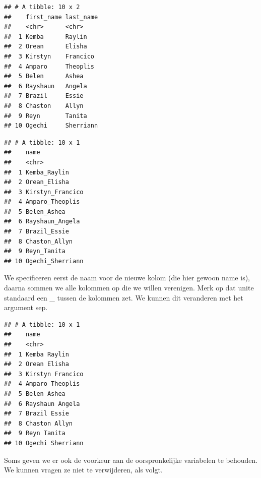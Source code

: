 \documentclass[]{tufte-book}
\newenvironment{Shaded}{}{}
\newcommand{\DataTypeTok}[1]{\textcolor[rgb]{0.56,0.13,0.00}{#1}}
\newcommand{\KeywordTok}[1]{\textcolor[rgb]{0.00,0.44,0.13}{\textbf{#1}}}
\newcommand{\NormalTok}[1]{#1}
\newcommand{\OperatorTok}[1]{\textcolor[rgb]{0.40,0.40,0.40}{#1}}
\newcommand{\StringTok}[1]{\textcolor[rgb]{0.25,0.44,0.63}{#1}}
\begin{document}
\begin{verbatim}
## # A tibble: 10 x 2
##    first_name last_name
##    <chr>      <chr>    
##  1 Kemba      Raylin   
##  2 Orean      Elisha   
##  3 Kirstyn    Francico 
##  4 Amparo     Theoplis 
##  5 Belen      Ashea    
##  6 Rayshaun   Angela   
##  7 Brazil     Essie    
##  8 Chaston    Allyn    
##  9 Reyn       Tanita   
## 10 Ogechi     Sherriann
\end{verbatim}

\begin{Shaded}
\end{Shaded}

\begin{verbatim}
## # A tibble: 10 x 1
##    name            
##    <chr>           
##  1 Kemba_Raylin    
##  2 Orean_Elisha    
##  3 Kirstyn_Francico
##  4 Amparo_Theoplis 
##  5 Belen_Ashea     
##  6 Rayshaun_Angela 
##  7 Brazil_Essie    
##  8 Chaston_Allyn   
##  9 Reyn_Tanita     
## 10 Ogechi_Sherriann
\end{verbatim}

We specificeren eerst de naam voor de nieuwe kolom (die hier gewoon name is), daarna sommen we alle kolommen op die we willen verenigen. Merk op dat unite standaard een \_ tussen de kolommen zet. We kunnen dit veranderen met het argument sep.

\begin{Shaded}
\end{Shaded}

\begin{verbatim}
## # A tibble: 10 x 1
##    name            
##    <chr>           
##  1 Kemba Raylin    
##  2 Orean Elisha    
##  3 Kirstyn Francico
##  4 Amparo Theoplis 
##  5 Belen Ashea     
##  6 Rayshaun Angela 
##  7 Brazil Essie    
##  8 Chaston Allyn   
##  9 Reyn Tanita     
## 10 Ogechi Sherriann
\end{verbatim}

Soms geven we er ook de voorkeur aan de oorspronkelijke variabelen te behouden. We kunnen vragen ze niet te verwijderen, als volgt.
\end{document}

